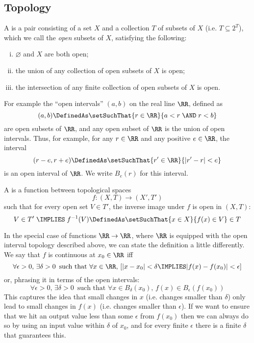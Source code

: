 \newpage
\subsection{Topology}

A  is a pair consisting of a set $X$ and a collection $T$ of subsets of $X$ (i.e. $T \subseteq 2^T$), which we call the \emph{open} subsets of $X$, satisfying the following:
\begin{enumerate}[(i)]
\item $\varnothing$ and $X$ are both open;
\item the union of any collection of open subsets of $X$ is open;
\item the intersection of any finite collection of open subsets of $X$ is open.
\end{enumerate}

For example the ``open intervals'' $(a,b)$ on the real line $\RR$, defined as
\[
(a,b) \DefinedAs \setSuchThat{r \in \RR}{a < r \;\AND\; r < b}
\]
are open subsets of $\RR$, and any open subset of $\RR$ is the union of open intervals.  Thus, for example, for any $r \in \RR$ and any positive $e \in \RR$, the interval 
\[
(r-e, r+e) \DefinedAs \setSuchThat{r' \in \RR}{|r' - r| < e}
\] 
is an open interval of $\RR$.  We write $B_e(r)$ for this interval.

A  is a function between topological spaces
\[
f: (X,T) \to (X', T')
\] 
such that for every open set $V \in T'$, the inverse image under $f$ is open in $(X,T)$:
\[
V \in T' 
\;\IMPLIES\;
f^{-1}(V) \DefinedAs \setSuchThat{x \in X}{f(x) \in V} \in T
\]


In the special case of functions $\RR \to \RR$, where $\RR$ is equipped with the open interval topology described above, we can state the definition a little differently.  We say that $f$ is continuous at $x_0 \in \RR$ iff 
\[
\forall \epsilon >0,\,
\exists \delta > 0\,
\mbox{ such that }
\forall x \in \RR,\,
[
|x - x_0| < \delta
\IMPLIES
|f(x) - f(x_0)| < \epsilon
]
\]
or, phrasing it in terms of the open intervals:
\[
\forall \epsilon >0,\,
\exists \delta > 0\,
\mbox{ such that }
\forall x \in B_{\delta}(x_0),\, 
f(x) \in B_{\epsilon}(f(x_0))
\]
This captures the idea that small changes in $x$ (i.e. changes smaller than $\delta$) only lead to small changes in $f(x)$ (i.e. changes smaller than $\epsilon$).
If we want to ensure that we hit an output value less than some $\epsilon$ from $f(x_0)$ then we can always do so by using an input value within $\delta$ of $x_0$, and for every finite $\epsilon$ there is a finite $\delta$ that guarantees this.


